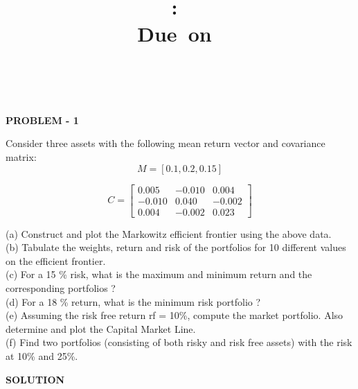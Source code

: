 \documentclass{article}
\title{
\vspace{2in}
\textmd{\textbf{\hmwkClass:\ \hmwkTitle}}\\
\normalsize\vspace{0.1in}\small{Due\ on\ \hmwkDueDate}\\
\vspace{0.1in}\large{\textit{\hmwkClassInstructor\ \hmwkClassTime}}
\vspace{3in}
}
\author{\textbf{\hmwkAuthorName}}
\date{} %
\begin{document}
\maketitle




\newpage




\begin{center}
\textbf{PROBLEM - 1}
\end{center}

Consider three assets with the following mean return vector and covariance matrix:
$$M = [0.1 , 0.2 , 0.15]$$

\[C =
\begin{bmatrix}
     0.005 & -0.010 & 0.004\\
	 -0.010 & 0.040 & -0.002\\
	  0.004 & -0.002 & 0.023
\end{bmatrix}
\]


(a) Construct and plot the Markowitz efficient frontier using the above data.\\
(b) Tabulate the weights, return and risk of the portfolios for 10 different values on the efficient frontier.\\
(c) For a 15 \% risk, what is the maximum and minimum return and the corresponding portfolios ?\\
(d) For a 18 \% return, what is the minimum risk portfolio ?\\
(e) Assuming the risk free return rf = 10\%, compute the market portfolio. Also determine and plot the
Capital Market Line.\\
(f) Find two portfolios (consisting of both risky and risk free assets) with the risk at 10\% and 25\%.

\begin{center}
\textbf{SOLUTION}
\end{center}
\end{document}
